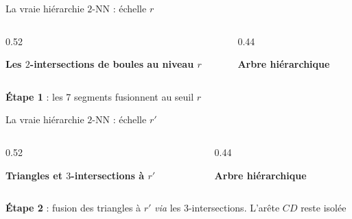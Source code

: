 \documentclass[A4,svgnames,9pt,aspectratio=169]{beamer}
\begin{document}
\begin{frame}{La vraie hiérarchie $2$-NN : échelle $r$}
    \begin{columns}[c, onlytextwidth]
        \begin{column}{0.52\textwidth}
            \begin{center}
                \textbf{Les $2$-intersections de boules au niveau $r$}

                \vspace{0.4cm}
                
            \end{center}
        \end{column}

        \begin{column}{0.44\textwidth}
            \begin{center}
                \textcolor{inria-rouge}{\textbf{Arbre hiérarchique}}

                \vspace{0.4cm}
                
            \end{center}
        \end{column}
    \end{columns}
    \vspace{0.3cm}
    \begin{center}
        \small \textbf{Étape 1} : les 7 segments fusionnent au seuil $r$
    \end{center}
\end{frame}

\begin{frame}{La vraie hiérarchie $2$-NN : échelle $r'$}
    \begin{columns}[c, onlytextwidth]
        \begin{column}{0.52\textwidth}
            \begin{center}
                \textbf{Triangles et $3$-intersections à $r'$}

                \vspace{0.4cm}
                
            \end{center}
        \end{column}

        \begin{column}{0.44\textwidth}
            \begin{center}
                \textcolor{inria-rouge}{\textbf{Arbre hiérarchique}}

                \vspace{0.4cm}
                
            \end{center}
        \end{column}
    \end{columns}
    \vspace{0.3cm}
    \begin{center}
        \small \textbf{Étape 2} : fusion des triangles à $r'$ \emph{via} les $3$-intersections. L'arête $CD$ reste isolée
    \end{center}
\end{frame}
\end{document}
